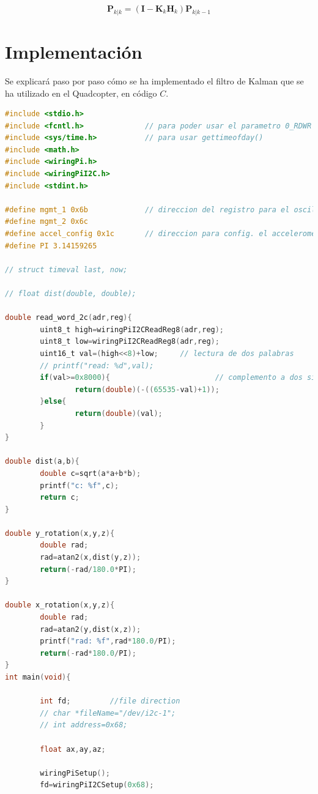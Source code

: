 \documentclass[twoside,11pt]{report}
\begin{document}
\begin{equation}
\mathbf{P}_{k|k} = (\mathbf{I} - \mathbf{K}_{k}\mathbf{H}_{k})\mathbf{P}_{k|k-1}
\end{equation}


\section*{Implementación}

Se explicará paso por paso cómo se ha implementado el filtro de Kalman que se ha utilizado en el Quadcopter, en código $C$. 

\begin{lstlisting}[language=C]
#include <stdio.h>
#include <fcntl.h>              // para poder usar el parametro 0_RDWR
#include <sys/time.h>           // para usar gettimeofday()
#include <math.h>
#include <wiringPi.h>
#include <wiringPiI2C.h>
#include <stdint.h>

#define mgmt_1 0x6b             // direccion del registro para el oscilador
#define mgmt_2 0x6c
#define accel_config 0x1c       // direccion para config. el accelerometro
#define PI 3.14159265

// struct timeval last, now;

// float dist(double, double);

double read_word_2c(adr,reg){
        uint8_t high=wiringPiI2CReadReg8(adr,reg);
        uint8_t low=wiringPiI2CReadReg8(adr,reg);
        uint16_t val=(high<<8)+low;     // lectura de dos palabras
        // printf("read: %d",val);
        if(val>=0x8000){                        // complemento a dos si es necesario
                return(double)(-((65535-val)+1));
        }else{
                return(double)(val);
        }
}

double dist(a,b){
        double c=sqrt(a*a+b*b);
        printf("c: %f",c);
        return c;
}

double y_rotation(x,y,z){
        double rad;
        rad=atan2(x,dist(y,z));
        return(-rad/180.0*PI);
}

double x_rotation(x,y,z){
        double rad;
        rad=atan2(y,dist(x,z));
        printf("rad: %f",rad*180.0/PI);
        return(-rad*180.0/PI);
}
int main(void){

        int fd;         //file direction
        // char *fileName="/dev/i2c-1";
        // int address=0x68;

        float ax,ay,az;

        wiringPiSetup();
        fd=wiringPiI2CSetup(0x68);


\end{lstlisting}
\end{document}
